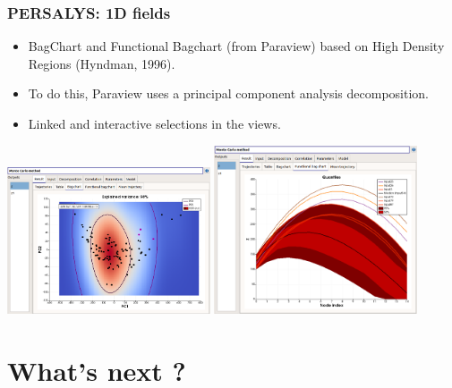 \documentclass{beamer}
\begin{document}
\begin{frame}
\frametitle{PERSALYS: 1D fields}
	
\begin{itemize}
\item BagChart and Functional Bagchart (from Paraview) 
based on High Density Regions (Hyndman, 1996).
\item To do this, Paraview uses a principal component analysis  
decomposition. 
\item Linked and interactive selections in the views. 
\end{itemize}

\begin{center}
\includegraphics[width=0.45\textwidth]{figures/persalys-field-bagchart.png}
\includegraphics[width=0.45\textwidth]{figures/persalys-field-functional-bagchart.png}
\end{center}

\end{frame}



\section{What's next ?}
\end{document}
